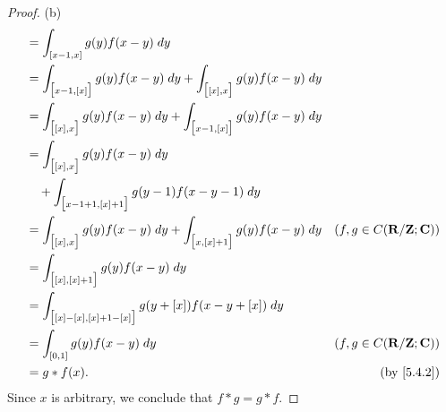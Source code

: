 \begin{proof}{(b)}
\begin{align*}
     & = \int_{[x - 1, x]} g(y) f(x - y) \; dy                                                                                      \\
     & = \int_{\big[x - 1, [x]\big]} g(y) f(x - y) \; dy + \int_{\big[[x], x\big]} g(y) f(x - y) \; dy                              \\
     & = \int_{\big[[x], x\big]} g(y) f(x - y) \; dy + \int_{\big[x - 1, [x]\big]} g(y) f(x - y) \; dy                              \\
     & = \int_{\big[[x], x\big]} g(y) f(x - y) \; dy                                                                                \\
     & \quad + \int_{\big[x - 1 + 1, [x] + 1\big]} g(y - 1) f(x - y - 1) \; dy                                                      \\
     & = \int_{\big[[x], x\big]} g(y) f(x - y) \; dy + \int_{\big[x, [x] + 1\big]} g(y) f(x - y) \; dy & (f, g \in C(\R / \Z ; \C)) \\
     & = \int_{\big[[x], [x] + 1\big]} g(y) f(x - y) \; dy                                                                          \\
     & = \int_{\big[[x] - [x], [x] + 1 - [x]\big]} g(y + [x]) f(x - y + [x]) \; dy                                                  \\
     & = \int_{[0, 1]} g(y) f(x - y) \; dy                                                             & (f, g \in C(\R / \Z ; \C)) \\
     & = g * f(x).                                                                                     & \text{(by \cref{5.4.2})}
  \end{align*}
  Since \(x\) is arbitrary, we conclude that \(f * g = g * f\).
\end{proof}

